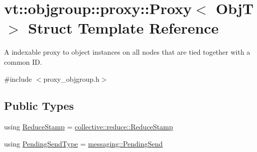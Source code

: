 \hypertarget{structvt_1_1objgroup_1_1proxy_1_1_proxy}{}\section{vt\+:\+:objgroup\+:\+:proxy\+:\+:Proxy$<$ ObjT $>$ Struct Template Reference}
\label{structvt_1_1objgroup_1_1proxy_1_1_proxy}


A indexable proxy to object instances on all nodes that are tied together with a common ID.  




{\ttfamily \#include $<$proxy\+\_\+objgroup.\+h$>$}

\subsection*{Public Types}
\begin{DoxyCompactItemize}
\item 
using \hyperlink{structvt_1_1objgroup_1_1proxy_1_1_proxy_a337be4c20cf11ff6477c7a66208cc909}{Reduce\+Stamp} = \hyperlink{namespacevt_1_1collective_1_1reduce_a7b7cb3021ac5654d92825d9fab0250b2}{collective\+::reduce\+::\+Reduce\+Stamp}
\item 
using \hyperlink{structvt_1_1objgroup_1_1proxy_1_1_proxy_a1bdf8713203531d306702a024872bb08}{Pending\+Send\+Type} = \hyperlink{structvt_1_1messaging_1_1_pending_send}{messaging\+::\+Pending\+Send}
\end{DoxyCompactItemize}
